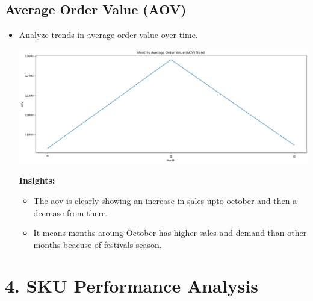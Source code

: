 \documentclass{article}
\begin{document}
    \subsection{Average Order Value (AOV)}
    \begin{itemize}
        \item Analyze trends in average order value over time.{
            \begin{center}
                \includegraphics[width=1\columnwidth]{images/month-aov.png}
            \end{center}
            \textbf{Insights:}
            \begin{itemize}
                \item The aov is clearly showing an increase in sales upto october and then a decrease from there.
                \item It means months aroung October has higher sales and demand than other months beacuse of festivals season.
            \end{itemize}
        }
    \end{itemize}


\section{4. SKU Performance Analysis}
\end{document}
